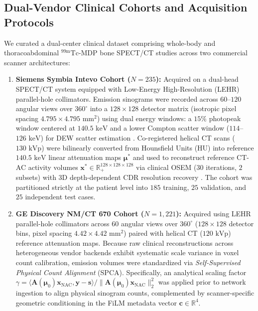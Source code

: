 \documentclass[11pt, a4paper]{article}
\begin{document}
\subsection{Dual-Vendor Clinical Cohorts and Acquisition Protocols}
We curated a dual-center clinical dataset comprising whole-body and thoracoabdominal $^{99\text{m}}\text{Tc}$-MDP bone SPECT/CT studies across two commercial scanner architectures:
\begin{enumerate}
    \item \textbf{Siemens Symbia Intevo Cohort ($N = 235$):} Acquired on a dual-head SPECT/CT system equipped with Low-Energy High-Resolution (LEHR) parallel-hole collimators. Emission sinograms were recorded across $60$--$120$ angular views over $360^\circ$ into a $128 \times 128$ detector matrix (isotropic pixel spacing $4.795 \times 4.795\text{ mm}^2$) using dual energy windows: a $15\%$ photopeak window centered at $140.5\text{ keV}$ and a lower Compton scatter window ($114$--$126\text{ keV}$) for DEW scatter estimation \cite{ref32}. Co-registered helical CT scans ($130\text{ kVp}$) were bilinearly converted from Hounsfield Units (HU) into reference $140.5\text{ keV}$ linear attenuation maps $\boldsymbol{\mu}^*$ and used to reconstruct reference CT-AC activity volumes $\mathbf{x}^* \in \mathbb{R}_+^{128 \times 128 \times 128}$ via clinical OSEM ($30$ iterations, $2$ subsets) with 3D depth-dependent CDR resolution recovery \cite{ref29}. The cohort was partitioned strictly at the patient level into $185$ training, $25$ validation, and $25$ independent test cases.
    \item \textbf{GE Discovery NM/CT 670 Cohort ($N = 1,221$):} Acquired using LEHR parallel-hole collimators across $60$ angular views over $360^\circ$ ($128 \times 128$ detector bins, pixel spacing $4.42 \times 4.42\text{ mm}^2$) paired with helical CT ($120\text{ kVp}$) reference attenuation maps. Because raw clinical reconstructions across heterogeneous vendor backends exhibit systematic scale variance in voxel count calibration, emission volumes were standardized via \emph{Self-Supervised Physical Count Alignment} (SPCA). Specifically, an analytical scaling factor $\gamma = \langle \mathbf{A}(\boldsymbol{\mu}_0) \mathbf{x}_{\text{NAC}}, \mathbf{y} - \mathbf{s} \rangle / \| \mathbf{A}(\boldsymbol{\mu}_0) \mathbf{x}_{\text{NAC}} \|_2^2$ was applied prior to network ingestion to align physical sinogram counts, complemented by scanner-specific geometric conditioning in the FiLM metadata vector $\mathbf{c} \in \mathbb{R}^4$.
\end{enumerate}
\end{document}
